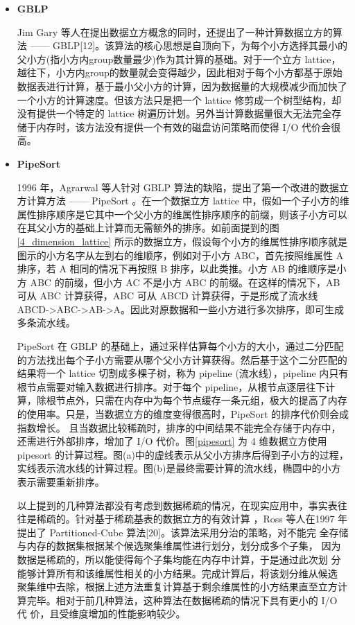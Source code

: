 \begin{itemize}

\item \textbf{GBLP}

Jim Gary 等人在提出数据立方概念的同时，还提出了一种计算数据立方的算法 —— GBLP[12]。该算法的核心思想是自顶向下，为每个小方选择其最小的父小方(指小方内group数量最少)作为其计算的基础。对于一个立方 lattice，越往下，小方内group的数量就会变得越少，因此相对于每个小方都基于原始数据表进行计算，基于最小父小方的计算，因为数据量的大规模减少而加快了一个小方的计算速度。但该方法只是把一个 lattice 修剪成一个树型结构，却没有提供一个特定的 lattice 树遍历计划。另外当计算数据量很大无法完全存储于内存时，该方法没有提供一个有效的磁盘访问策略而使得 I/O 代价会很高。

\item \textbf{PipeSort}

1996 年，Agrarwal 等人针对 GBLP 算法的缺陷，提出了第一个改进的数据立方计算方法 —— PipeSort\cite{agarwal1996computation} 。在一个数据立方 lattice 中，假如一个子小方的维属性排序顺序是它其中一个父小方的维属性排序顺序的前缀，则该子小方可以在其父小方的基础上计算而无需额外的排序。如前面提到的图\ref{4_dimension_lattice} 所示的数据立方，假设每个小方的维属性排序顺序就是图示的小方名字从左到右的维顺序，例如对于小方 ABC，首先按照维属性 A 排序，若 A 相同的情况下再按照 B 排序，以此类推。小方 AB 的维顺序是小方 ABC 的前缀，但小方 AC 不是小方 ABC 的前缀。在这样的情况下，AB 可从 ABC 计算获得，ABC 可从 ABCD 计算获得，于是形成了流水线 ABCD-\textgreater ABC-\textgreater AB-\textgreater A。因此对原数据和一些小方进行多次排序，即可生成多条流水线。

PipeSort 在 GBLP 的基础上，通过采样估算每个小方的大小，通过二分匹配的方法找出每个子小方需要从哪个父小方计算获得。然后基于这个二分匹配的结果将一个 lattice 切割成多棵子树，称为 pipeline (流水线），pipeline 内只有根节点需要对输入数据进行排序。对于每个 pipeline，从根节点逐层往下计算，除根节点外，只需在内存中为每个节点缓存一条元组，极大的提高了内存的使用率。只是，当数据立方的维度变得很高时，PipeSort 的排序代价则会成指数增长。 且当数据比较稀疏时，排序的中间结果不能完全存储于内存中，还需进行外部排序，增加了 I/O 代价。图\ref{pipesort} 为 4 维数据立方使用 pipesort 的计算过程。图(a)中的虚线表示从父小方排序后得到子小方的过程，实线表示流水线的计算过程。图(b)是最终需要计算的流水线，椭圆中的小方表示需要重新排序。

以上提到的几种算法都没有考虑到数据稀疏的情况，在现实应用中，事实表往往是稀疏的。针对基于稀疏基表的数据立方的有效计算 ，Ross 等人在1997 年提出了 Partitioned-Cube 算法[20]。该算法采用分治的策略，对不能完
全存储与内存的数据集根据某个候选聚集维属性进行划分，划分成多个子集，
因为数据是稀疏的，所以能使得每个子集均能在内存中计算，于是通过此次划
分能够计算所有和该维属性相关的小方结果。完成计算后，将该划分维从候选
聚集维中去除，根据上述方法重复计算基于剩余维属性的小方结果直至立方计
算完毕。相对于前几种算法，这种算法在数据稀疏的情况下具有更小的 I/O 代
价，且受维度增加的性能影响较少。


\end{itemize}
